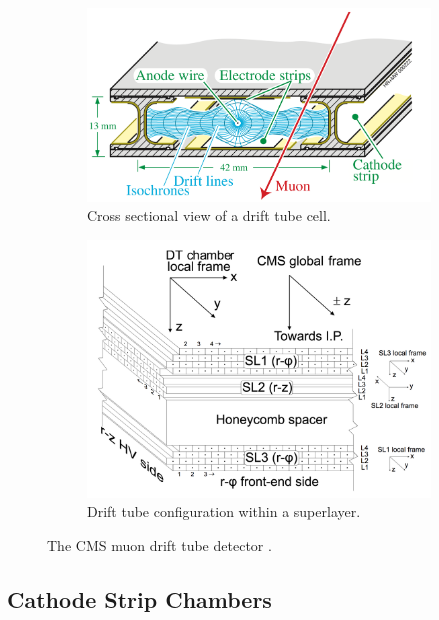 \begin{figure}[hbp!]
\centering
\begin{subfigure}[c]{0.475\textwidth}
\includegraphics[width=\textwidth]{figs/dtcell.png}
\caption{Cross sectional view of a drift tube cell.}
\end{subfigure}
\begin{subfigure}[c]{0.475\textwidth}
\includegraphics[width=\textwidth]{figs/superlayer.png}
\caption{Drift tube configuration within a superlayer.}
\end{subfigure}
\caption[The CMS muon drift tube detector.]{The CMS muon drift tube detector \cite{dtcellpic}.}
\label{fig:superlayer}
\end{figure}

\subsection{Cathode Strip Chambers}

